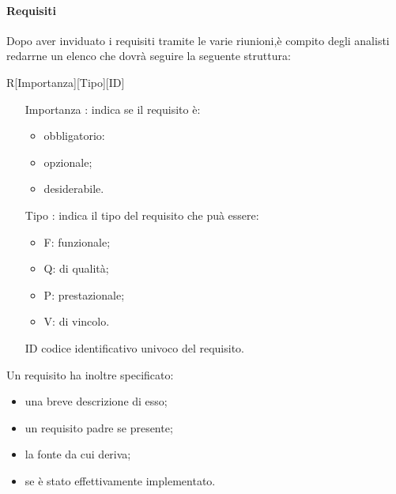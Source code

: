 		\paragraph{Requisiti}%
		Dopo aver inviduato i requisiti tramite le varie riunioni,è compito degli analisti redarrne un elenco che dovrà seguire la seguente struttura:
		\centerline{R[Importanza][Tipo][ID]}
		\begin{itemize}
			\item[Importanza]: indica se il requisito è:
			\begin{itemize}
				\item obbligatorio:
				\item opzionale;
				\item desiderabile.
			\end{itemize}
			\item[Tipo]: indica il tipo del requisito che puà essere:
			\begin{itemize}
				\item F: funzionale;
				\item Q: di qualità;
				\item P: prestazionale;
				\item V: di vincolo.
			\end{itemize}
			\item [ID] codice identificativo univoco del requisito.
		\end{itemize}
	    Un requisito ha inoltre specificato:
		\begin{itemize}
		\item una breve descrizione di esso;
		\item un requisito padre se presente;
		\item la fonte da cui deriva;
		\item se è stato effettivamente implementato.
		\end{itemize}
